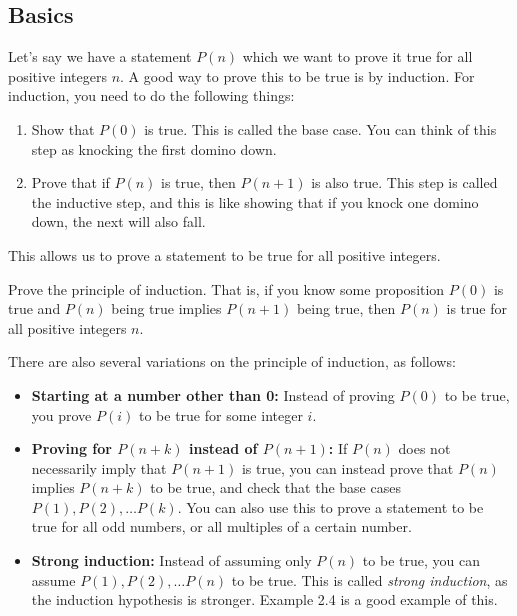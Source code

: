 \documentclass{article}
\newcommand{\skipline}{\vspace{2mm}}
\begin{document}
\subsection{Basics}
Let's say we have a statement $P(n)$ which we want to prove it true for all positive integers $n$. A good way to prove this to be true is by induction. For induction, you need to do the following things:
\begin{enumerate}
    \item Show that $P(0)$ is true. This is called the base case. You can think of this step as knocking the first domino down. 
    \item Prove that if $P(n)$ is true, then $P(n+1)$ is also true. This step is called the inductive step, and this is like showing that if you knock one domino down, the next will also fall. 
\end{enumerate}
This allows us to prove a statement to be true for all positive integers. 
\begin{exam}
Prove the principle of induction. That is, if you know some proposition $P(0)$ is true and $P(n)$ being true implies $P(n+1)$ being true, then $P(n)$ is true for all positive integers $n$.   
\end{exam}
\skipline
\noindent
There are also several variations on the principle of induction, as follows: 
\begin{itemize}
    \item \textbf{Starting at a number other than 0:} Instead of proving $P(0)$ to be true, you prove $P(i)$ to be true for some integer $i$. 
    \item \textbf{Proving for $P(n+k)$ instead of $P(n+1)$:} If $P(n)$ does not necessarily imply that $P(n+1)$ is true, you can instead prove that $P(n)$ implies $P(n+k)$ to be true, and check that the base cases $P(1), P(2), \dots P(k)$. You can also use this to prove a statement to be true for all odd numbers, or all multiples of a certain number. 
    \item \textbf{Strong induction:} Instead of assuming only $P(n)$ to be true, you can assume $P(1), P(2), \dots P(n)$ to be true. This is called \textit{strong induction}, as the induction hypothesis is stronger. Example 2.4 is a good example of this. 
\end{itemize}
\end{document}
